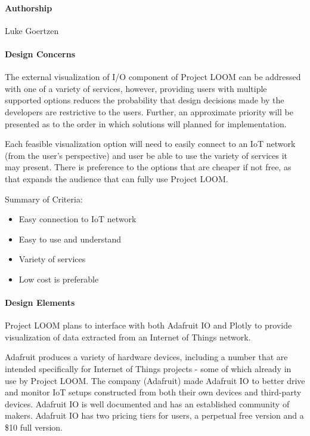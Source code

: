 \documentclass[onecolumn, draftclsnofoot,10pt, compsoc]{IEEEtran}
\begin{document}
\paragraph{Authorship}
    Luke Goertzen

\paragraph{Design Concerns}
    The external visualization of I/O component of Project LOOM can be addressed with one of a variety of services, however, providing users with multiple supported options reduces the probability that design decisions made by the developers are restrictive to the users. Further, an approximate priority will be presented as to the order in which solutions will planned for implementation.

    Each feasible visualization option will need to easily connect to an IoT network (from the user's perspective) and user be able to use the variety of services it may present. There is preference to the options that are cheaper if not free, as that expands the audience that can fully use Project LOOM.

    Summary of Criteria:
    \begin{itemize}[noitemsep,topsep=-10pt]
        \item Easy connection to IoT network
        \item Easy to use and understand
        \item Variety of services
        \item Low cost is preferable
    \end{itemize}

\paragraph{Design Elements}
    Project LOOM plans to interface with both Adafruit IO and Plotly to provide visualization of data extracted from an Internet of Things network.

    Adafruit produces a variety of hardware devices, including a number that are intended specifically for Internet of Things projects - some of which already in use by Project LOOM. The company (Adafruit) made Adafruit IO to better drive and monitor IoT setups constructed from both their own devices and third-party devices. Adafruit IO is well documented and has an established community of makers. Adafruit IO has two pricing tiers for users, a perpetual free version and a \$10 full version.
\end{document}
